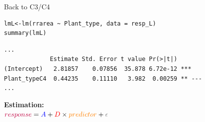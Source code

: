 \documentclass{beamer}
\makeatletter
\newenvironment{kframe}{%
 \def\at@end@of@kframe{}%
 \ifinner\ifhmode%
  \def\at@end@of@kframe{\end{minipage}}%
  \begin{minipage}{\columnwidth}%
 \fi\fi%
 \def\FrameCommand##1{\hskip\@totalleftmargin \hskip-\fboxsep
 \colorbox{shadecolor}{##1}\hskip-\fboxsep
     \hskip-\linewidth \hskip-\@totalleftmargin \hskip\columnwidth}%
 \MakeFramed {\advance\hsize-\width
   \@totalleftmargin\z@ \linewidth\hsize
   \@setminipage}}%
 {\par\unskip\endMakeFramed%
 \at@end@of@kframe}
\newenvironment{knitrout}{}{} %
\makeatother
\begin{document}
\begin{frame}[fragile]{Back to C3/C4}
\begin{knitrout}
\color{fgcolor}\begin{kframe}
\begin{verbatim}
lmL<-lm(rrarea ~ Plant_type, data = resp_L)
summary(lmL)
\end{verbatim}
\end{kframe}
\end{knitrout}

\vspace{-0.15cm}
\pause
\begin{knitrout}
\color{fgcolor}\begin{kframe}
\footnotesize
\begin{verbatim}
...
             Estimate Std. Error t value Pr(>|t|)    
(Intercept)   2.81857    0.07856  35.878 6.72e-12 ***
Plant_typeC4  0.44235    0.11110   3.982  0.00259 ** ---
...
\end{verbatim}
\end{kframe}
\end{knitrout}

\textbf{Estimation:\\}
${\color{purple}{response}} = {\color{blue}{A}} + {\color{red}{D}} \times {\color{orange}{predictor}} + {\color{gray}{\epsilon}}$\\


\vspace{0.2cm}

\end{frame}
\end{document}
